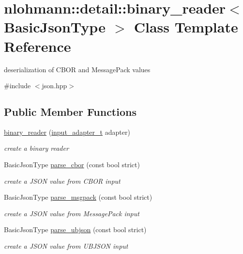 \hypertarget{classnlohmann_1_1detail_1_1binary__reader}{}\section{nlohmann\+:\+:detail\+:\+:binary\+\_\+reader$<$ Basic\+Json\+Type $>$ Class Template Reference}
\label{classnlohmann_1_1detail_1_1binary__reader}


deserialization of C\+B\+OR and Message\+Pack values  




{\ttfamily \#include $<$json.\+hpp$>$}

\subsection*{Public Member Functions}
\begin{DoxyCompactItemize}
\item 
\mbox{\hyperlink{classnlohmann_1_1detail_1_1binary__reader_a7e643baadaf4c31718cd74833bdd542f}{binary\+\_\+reader}} (\mbox{\hyperlink{namespacenlohmann_1_1detail_ae132f8cd5bb24c5e9b40ad0eafedf1c2}{input\+\_\+adapter\+\_\+t}} adapter)
\begin{DoxyCompactList}\small\item\em create a binary reader \end{DoxyCompactList}\item 
Basic\+Json\+Type \mbox{\hyperlink{classnlohmann_1_1detail_1_1binary__reader_a04bcdc8f55b26fafa9775a2f89e48fc2}{parse\+\_\+cbor}} (const bool strict)
\begin{DoxyCompactList}\small\item\em create a J\+S\+ON value from C\+B\+OR input \end{DoxyCompactList}\item 
Basic\+Json\+Type \mbox{\hyperlink{classnlohmann_1_1detail_1_1binary__reader_ab4a4a6f5ab3cc77aac374c9c889e580e}{parse\+\_\+msgpack}} (const bool strict)
\begin{DoxyCompactList}\small\item\em create a J\+S\+ON value from Message\+Pack input \end{DoxyCompactList}\item 
Basic\+Json\+Type \mbox{\hyperlink{classnlohmann_1_1detail_1_1binary__reader_ad0be02d1df4ba4fbe601b0985f5300ac}{parse\+\_\+ubjson}} (const bool strict)
\begin{DoxyCompactList}\small\item\em create a J\+S\+ON value from U\+B\+J\+S\+ON input \end{DoxyCompactList}\end{DoxyCompactItemize}
